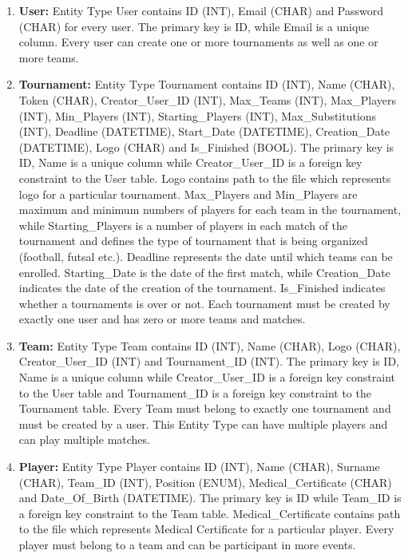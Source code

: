 \begin{enumerate}
    \item \textbf{User:} Entity Type User contains ID (INT), Email (CHAR) and Password (CHAR) for every user. The primary key is ID, while Email is a unique column. Every user can create one or more tournaments as well as one or more teams.
    
    \item \textbf{Tournament:} Entity Type Tournament contains ID (INT), Name (CHAR), Token (CHAR), Creator\_User\_ID (INT), Max\_Teams (INT), Max\_Players (INT), Min\_Players (INT), Starting\_Players (INT), Max\_Substitutions (INT), Deadline (DATETIME), Start\_Date (DATETIME), Creation\_Date (DATETIME), Logo (CHAR) and Is\_Finished (BOOL). The primary key is ID, Name is a unique column while Creator\_User\_ID is a foreign key constraint to the User table. Logo contains path to the file which represents logo for a particular tournament. Max\_Players and Min\_Players are maximum and minimum numbers of players for each team in the tournament, while Starting\_Players is a number of players in each match of the tournament and defines the type of tournament that is being organized (football, futsal etc.). Deadline represents the date until which teams can be enrolled. Starting\_Date is the date of the first match, while Creation\_Date indicates the date of the creation of the tournament. Is\_Finished indicates whether a tournaments is over or not. Each tournament must be created by exactly one user and has zero or more teams and matches.
    
    \item \textbf{Team:} Entity Type Team contains ID (INT), Name (CHAR), Logo (CHAR), Creator\_User\_ID (INT) and Tournament\_ID (INT). The primary key is ID, Name is a unique column while Creator\_User\_ID is a foreign key constraint to the User table and Tournament\_ID is a foreign key constraint to the Tournament table. Every Team must belong to exactly one tournament and must be created by a user. This Entity Type can have multiple players and can play multiple matches. 

    \item \textbf{Player:} Entity Type Player contains ID (INT), Name (CHAR), Surname (CHAR), Team\_ID (INT), Position (ENUM), Medical\_Certificate (CHAR) and Date\_Of\_Birth (DATETIME). The primary key is ID while Team\_ID is a foreign key constraint to the Team table.  Medical\_Certificate contains path to the file which represents Medical Certificate for a particular player. Every player must belong to a team and can be participant in more events.


\end{enumerate}

